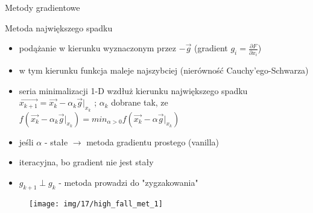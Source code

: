   \begin{frame}{Metody gradientowe}

    \begin{block}{Metoda największego spadku}
    \begin{itemize}
        \item podążanie w kierunku wyznaczonym przez  $- \vec g$ (gradient $g_i = \left. \frac{\partial F}{\partial x_i}$)
        \item w tym kierunku funkcja maleje najszybciej (nierówność Cauchy’ego-Schwarza)
        \item seria minimalizacji 1-D wzdłuż kierunku największego spadku $\vec{x_{k+1}}=\vec{x_k}-\alpha_k \vec{g}\vert_{x_k}$ ; $\alpha_k$ dobrane tak, ze $f(\vec{x_k}-\alpha_k \vec{g}\vert_{x_k})=min_{\alpha>0} f(\vec{x_k}-\alpha \vec{g}\vert_{x_k})$
        \item jeśli $\alpha$ - stałe $\rightarrow$ metoda gradientu prostego (vanilla)
        \item iteracyjna, bo gradient nie jest stały 
 \item $g_{k+1}\perp g_{k}$ - metoda  prowadzi do "zygzakowania"
    \end{itemize}
 \end{block} 
	 \end{frame}
	 \begin{frame}
  	
    \begin{figure}
		\centering
		\texttt{[image: img/17/high\_fall\_met\_1]}
	\end{figure}

  \end{frame}



